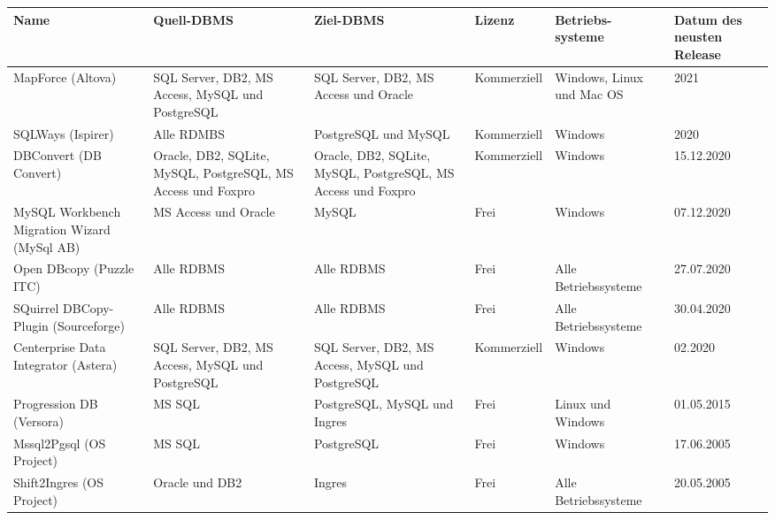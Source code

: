\renewcommand{\thefootnote}{\roman{footnote}}
\begin{table}[h]
	\begin{center}
		\begin{tabular}{ |p{2.5cm}|p{3cm}|p{3cm}|p{2cm}|p{2cm}|p{1.5cm}| }
			\hline
			\textbf{Name} & \textbf{Quell-DBMS} &  \textbf{Ziel-DBMS} &\textbf{Lizenz} & \textbf{Betriebs- systeme} & Datum des neusten Release\\
			\hline
			MapForce (Altova)\footnotemark[1]& SQL Server, DB2, MS Access, MySQL und PostgreSQL  & SQL Server, DB2, MS Access und Oracle & Kommerziell & Windows, Linux und Mac OS & 2021 \\
			\hline
			SQLWays (Ispirer)\footnotemark[2] & Alle RDMBS & PostgreSQL und MySQL & Kommerziell & Windows &2020 \\
			\hline
			DBConvert (DB Convert)\footnotemark[3] & Oracle, DB2, SQLite, MySQL, PostgreSQL, MS Access und Foxpro & Oracle, DB2, SQLite, MySQL, PostgreSQL, MS Access und Foxpro & Kommerziell & Windows & 15.12.2020 \\
			\hline
			MySQL Workbench Migration Wizard (MySql AB) \footnotemark[4] &  MS Access und Oracle &  MySQL & Frei & Windows & 07.12.2020  \\
			\hline
			Open DBcopy (Puzzle ITC) \footnotemark[5] & Alle RDBMS& Alle RDBMS & Frei & Alle Betriebssysteme & 27.07.2020 \\
			\hline
			SQuirrel DBCopy-Plugin (Sourceforge)\footnotemark[6] & Alle RDBMS  & Alle RDBMS & Frei & Alle Betriebssysteme & 30.04.2020\\
			\hline
			Centerprise Data Integrator (Astera)\footnotemark[7] & SQL Server, DB2, MS Access, MySQL und PostgreSQL& SQL Server, DB2, MS Access, MySQL und PostgreSQL& 
			Kommerziell & Windows & 02.2020 \\
			\hline
			Progression DB (Versora)\footnotemark[8] &  MS SQL &  PostgreSQL, MySQL und	Ingres & Frei & Linux und Windows & 01.05.2015 \\ %
			\hline
			Mssql2Pgsql (OS Project)\footnotemark[9] &   MS SQL&   PostgreSQL  & Frei & Windows & 17.06.2005 \\ %
			\hline
			Shift2Ingres (OS Project)\footnotemark[10] & Oracle und DB2 & Ingres & Frei &  Alle Betriebssysteme & 20.05.2005 \\ %
			\hline

\end{tabular}
\end{center}
\end{table}
